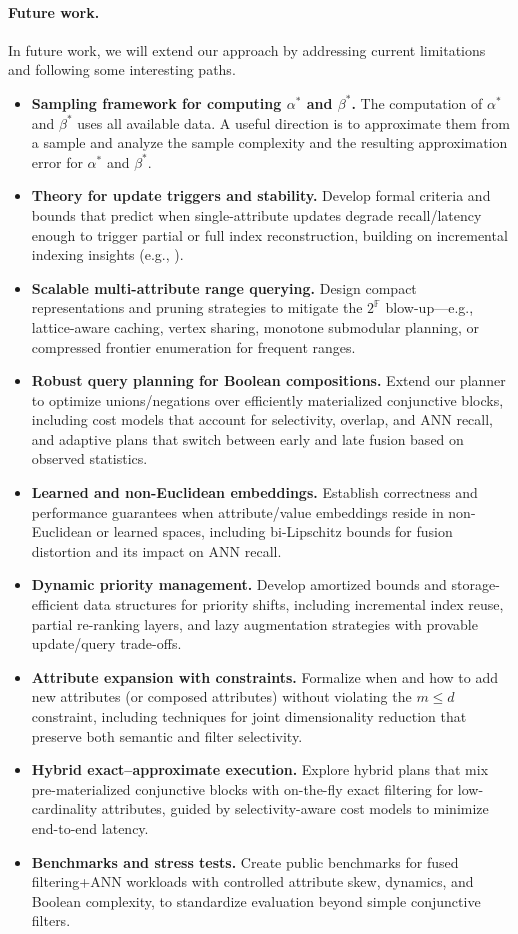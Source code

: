 \documentclass[numbers,sort]{article}
\begin{document}
\paragraph{Future work.} In future work, we will extend our approach by addressing current limitations and following some interesting paths.
\begin{itemize}[leftmargin=*, nosep]
    \item \textbf{Sampling framework for computing $\alpha^*$ and $\beta^*$.} The computation of \(\alpha^*\) and \(\beta^*\) uses all available data. A useful direction is to approximate them from a sample and analyze the sample complexity and the resulting approximation error for \(\alpha^*\) and \(\beta^*\).
    \item \textbf{Theory for update triggers and stability.} Develop formal criteria and bounds that predict when single-attribute updates degrade recall/latency enough to trigger partial or full index reconstruction, building on incremental indexing insights (e.g., \cite{mohoney2024incremental}).
    \item \textbf{Scalable multi-attribute range querying.} Design compact representations and pruning strategies to mitigate the \(2^{\mathbb{F}}\) blow-up—e.g., lattice-aware caching, vertex sharing, monotone submodular planning, or compressed frontier enumeration for frequent ranges.
    \item \textbf{Robust query planning for Boolean compositions.} Extend our planner to optimize unions/negations over efficiently materialized conjunctive blocks, including cost models that account for selectivity, overlap, and ANN recall, and adaptive plans that switch between early and late fusion based on observed statistics.
    \item \textbf{Learned and non-Euclidean embeddings.} Establish correctness and performance guarantees when attribute/value embeddings reside in non-Euclidean or learned spaces, including bi-Lipschitz bounds for fusion distortion and its impact on ANN recall.
    \item \textbf{Dynamic priority management.} Develop amortized bounds and storage-efficient data structures for priority shifts, including incremental index reuse, partial re-ranking layers, and lazy augmentation strategies with provable update/query trade-offs.
    \item \textbf{Attribute expansion with constraints.} Formalize when and how to add new attributes (or composed attributes) without violating the \(m \le d\) constraint, including techniques for joint dimensionality reduction that preserve both semantic and filter selectivity.
    \item \textbf{Hybrid exact--approximate execution.} Explore hybrid plans that mix pre-materialized conjunctive blocks with on-the-fly exact filtering for low-cardinality attributes, guided by selectivity-aware cost models to minimize end-to-end latency.
    \item \textbf{Benchmarks and stress tests.} Create public benchmarks for fused filtering+ANN workloads with controlled attribute skew, dynamics, and Boolean complexity, to standardize evaluation beyond simple conjunctive filters.
\end{itemize}
\end{document}
